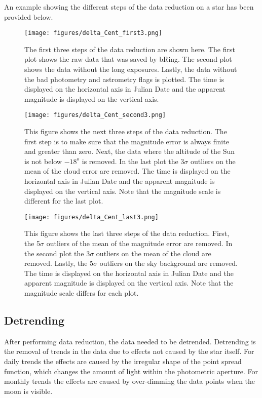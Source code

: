 \documentclass[onecolumn]{aa} %
\begin{document}
An example showing the different steps of the data reduction on a star has been provided below.

\begin{figure}
    \centering
    \texttt{[image: figures/delta\_Cent\_first3.png]}
    \caption{The first three steps of the data reduction are shown here. The first plot shows the raw data that was saved by bRing. The second plot shows the data without the long exposures. Lastly, the data without the bad photometry and astrometry flags is plotted. The time is displayed on the horizontal axis in Julian Date and the apparent magnitude is displayed on the vertical axis.}
    \label{deltaCen1}
\end{figure}
\begin{figure}
    \centering
    \texttt{[image: figures/delta\_Cent\_second3.png]}
    \caption{This figure shows the next three steps of the data reduction. The first step is to make sure that the magnitude error is always finite and greater than zero. Next, the data where the altitude of the Sun is not below $-18^o$ is removed. In the last plot the 3$\sigma$ outliers on the mean of the cloud error are removed. The time is displayed on the horizontal axis in Julian Date and the apparent magnitude is displayed on the vertical axis. Note that the magnitude scale is different for the last plot.}
    \label{deltaCen2}
\end{figure}
\begin{figure}
    \centering
    \texttt{[image: figures/delta\_Cent\_last3.png]}
    \caption{This figure shows the last three steps of the data reduction. First, the 5$\sigma$ outliers of the mean of the magnitude error are removed. In the second plot the 3$\sigma$ outliers on the mean of the cloud are removed. Lastly, the 5$\sigma$ outliers on the sky background are removed. The time is displayed on the horizontal axis in Julian Date and the apparent magnitude is displayed on the vertical axis. Note that the magnitude scale differs for each plot.}
    \label{deltaCen3}
\end{figure}


\subsection{Detrending}
After performing data reduction, the data needed to be detrended. Detrending is the removal of trends in the data due to effects not caused by the star itself. For daily trends the effects are caused by the irregular shape of the point spread function, which changes the amount of light within the photometric aperture. For monthly trends the effects are caused by over-dimming the data points when the moon is visible.
\end{document}
